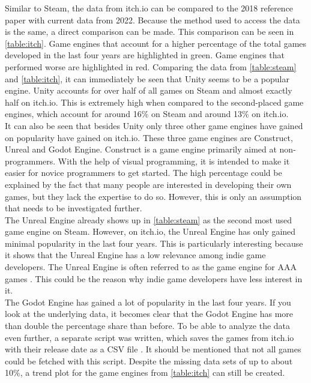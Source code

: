 Similar to Steam, the data from itch.io can be compared to the 2018 reference paper with current data from 2022.
Because the method used to access the data is the same, a direct comparison can be made.
This comparison can be seen in \autoref{table:itch}.
Game engines that account for a higher percentage of the total games developed in the last four years are highlighted in green.
Game engines that performed worse are highlighted in red.
Comparing the data from \autoref{table:steam} and \autoref{table:itch}, it can immediately be seen that Unity seems to be a popular engine.
Unity accounts for over half of all games on Steam and almost exactly half on itch.io.
This is extremely high when compared to the second-placed game engines, which account for around 16\% on Steam and around 13\% on itch.io.\\

It can also be seen that besides Unity only three other game engines have gained on popularity have gained on itch.io.
These three game engines are Construct, Unreal and Godot Engine.
Construct is a game engine primarily aimed at non-programmers.
With the help of visual programming, it is intended to make it easier for novice programmers to get started.
The high percentage could be explained by the fact that many people are interested in developing their own games, but they lack the expertise to do so.
However, this is only an assumption that needs to be investigated further. \\

The Unreal Engine already shows up in \autoref{table:steam} as the second most used game engine on Steam.
However, on itch.io, the Unreal Engine has only gained minimal popularity in the last four years.
This is particularly interesting because it shows that the Unreal Engine has a low relevance among indie game developers.
The Unreal Engine is often referred to as the game engine for AAA games \cite{unreal-tripple-a-yager, unreal-tripple-a-india}.
This could be the reason why indie game developers have less interest in it. \\

The Godot Engine has gained a lot of popularity in the last four years.
If you look at the underlying data, it becomes clear that the Godot Engine has more than double the percentage share than before.
To be able to analyze the data even further, a separate script was written, which saves the games from itch.io with their release date as a CSV file \cite{github-trend-itch}.
It should be mentioned that not all games could be fetched with this script.
Despite the missing data sets of up to about 10\%, a trend plot for the game engines from \autoref{table:itch} can still be created.

